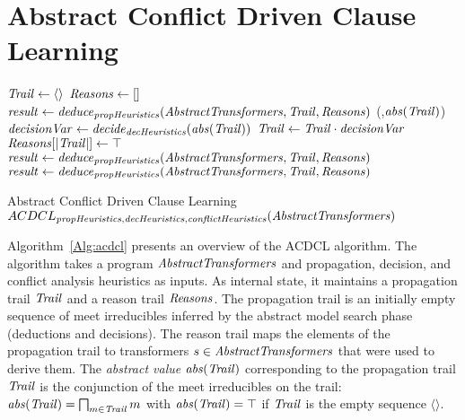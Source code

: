 \section{Abstract Conflict Driven Clause Learning}
%
\begin{algorithm2e}[t]
\DontPrintSemicolon
{}
\begin{small}
$\mathit{Trail} \leftarrow \langle\rangle$ \;
$\mathit{Reasons} \leftarrow []$ \;
$\mathit{result} \leftarrow \mathit{deduce}_{\mathit{propHeuristics}}(\mathit{AbstractTransformers},\mathit{Trail},\mathit{Reasons})$ \;
 {
  \return \safe}
{
 {
  \return (\unsafe,$\mathit{abs}(\mathit{Trail})$)}
  $\mathit{decisionVar} \leftarrow \mathit{decide}_{\mathit{decHeuristics}}(\mathit{abs}(\mathit{Trail}))$ \;
  $\mathit{Trail} \leftarrow \mathit{Trail} \cdot \mathit{decisionVar}$ \; 
  $\mathit{Reasons}[|\mathit{Trail}|] \leftarrow \top$ \;
  $\mathit{result} \leftarrow \mathit{deduce}_{\mathit{propHeuristics}}(\mathit{AbstractTransformers},\mathit{Trail},\mathit{Reasons})$\;
   {
    \lIf{$\neg \analyzeconflict_{\confheur}(\abstransset,\trail,\reasons)$} {
      \return \safe
    }
    $\mathit{result} \leftarrow \mathit{deduce}_{\mathit{propHeuristics}}(\mathit{AbstractTransformers},\mathit{Trail},\mathit{Reasons})$ \;
  }
}
\end{small}
\caption{Abstract Conflict Driven Clause Learning $ACDCL_{\mathit{propHeuristics},\mathit{decHeuristics},\mathit{conflictHeuristics}}(\mathit{AbstractTransformers})$ \label{Alg:acdcl}}
\end{algorithm2e}
%
Algorithm~\ref{Alg:acdcl} presents an overview of the ACDCL algorithm.
The algorithm takes a program 
$\mathit{AbstractTransformers}$ and propagation, decision, and conflict analysis
heuristics as inputs.  
As internal state, it maintains a propagation
trail $\mathit{Trail}$ and a reason trail  $\mathit{Reasons}$.
The propagation trail is an initially empty sequence of meet
irreducibles inferred by the abstract model search phase (deductions
and decisions). The reason trail maps the elements of the
propagation trail to transformers $s\in\mathit{AbstractTransformers}$ that were used to
derive them. The \emph{abstract value} $\mathit{abs}(\mathit{Trail})$
corresponding to the propagation trail $\mathit{Trail}$ is the
conjunction of the meet irreducibles on the trail:
$\mathit{abs}(\mathit{Trail})=\bigsqcap_{m \in \mathit{Trail}}m$ with
$\mathit{abs}(\mathit{Trail})=\top$ if $\mathit{Trail}$ is the empty
sequence $\langle\rangle$.

